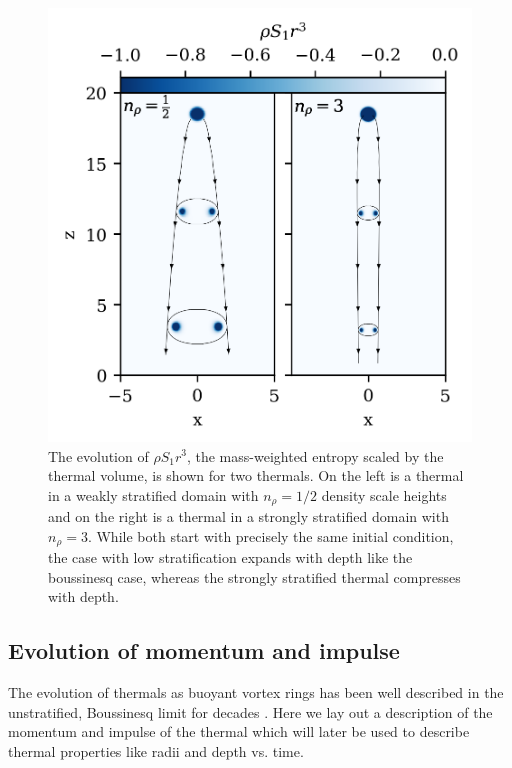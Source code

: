 \documentclass[twocolumn, amsmath, amsfonts, amssymb, trackchanges]{aastex62}
\begin{document}
\begin{figure}[t!]
    \includegraphics[width=\columnwidth]{evolution_colormeshes.png}
    \caption{
	The evolution of $\rho S_1 r^3$, the mass-weighted entropy scaled by the thermal volume, is shown for two thermals. 
	On the left is a thermal in a weakly stratified domain with $n_\rho = 1/2$ density scale heights and on the right is a thermal in a strongly stratified domain with $n_\rho = 3$.
	While both start with precisely the same initial condition, the case with low stratification expands with depth like the boussinesq case, whereas the strongly stratified thermal compresses with depth.
    \label{fig:evolution_colormeshes} }
\end{figure}


\subsection{Evolution of momentum and impulse}
The evolution of thermals as buoyant vortex rings has been well described in the unstratified, Boussinesq limit for decades \citep[see e.g.][for a description and sources]{lecoanet&jeevanjee2018}.
Here we lay out a description of the momentum and impulse of the thermal which will later be used to describe thermal properties like radii and depth vs. time.
\end{document}
